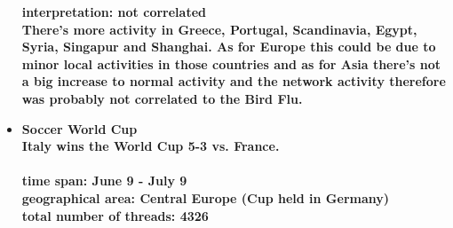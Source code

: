 \documentclass[11pt,a4paper,english]{article}
\begin{document}
\begin{itemize}
						\bf interpretation: \rm not correlated
						\\ There's more activity in Greece, Portugal, Scandinavia, Egypt, Syria, Singapur and Shanghai. As for Europe this could be due to minor local activities in those countries and as for Asia there's not a big increase to normal activity and the network activity therefore was probably not correlated to the Bird Flu.
	
					
					\item \bf Soccer World Cup \rm
						\\ Italy wins the World Cup 5-3 vs. France.
						\\\\ \bf time span: \rm June 9 - July 9
						\\ \bf geographical area: \rm Central Europe (Cup held in Germany)
						\\ \bf total number of threads: \rm 4326
						
						\begin{figure}[H]
							\vspace{-13pt}
  						

\end{figure}
\end{itemize}
\end{document}
